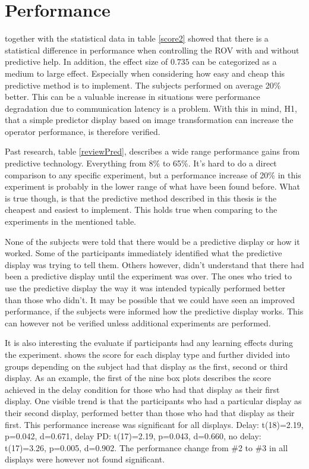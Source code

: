 \section{Performance}

 together with the statistical data in table \ref{score2} showed that there is a statistical difference in performance when controlling the ROV with and without predictive help. In addition, the effect size of $0.735$ can be categorized as a medium to large effect. Especially when considering how easy and cheap this predictive method is to implement. The subjects performed on average 20\% better. This can be a valuable increase in situations were performance degradation due to communication latency is a problem. With this in mind, H1, that a simple predictor display based on image transformation can increase the operator performance, is therefore verified.

Past research, table \ref{reviewPred}, describes a wide range performance gains from predictive technology. Everything from 8\% to 65\%. It's hard to do a direct comparison to any specific experiment, but a performance increase of 20\% in this experiment is probably in the lower range of what have been found before. What is true though, is that the predictive method described in this thesis is the cheapest and easiest to implement. This holds true when comparing to the experiments in the mentioned table.

None of the subjects were told that there would be a predictive display or how it worked. Some of the participants immediately identified what the predictive display was trying to tell them. Others however, didn't understand that there had been a predictive display until the experiment was over. The ones who tried to use the predictive display the way it was intended typically performed better than those who didn't. It may be possible that we could have seen an improved performance, if the subjects were informed how the predictive display works. This can however not be verified unless additional experiments are performed.

It is also interesting the evaluate if participants had any learning effects during the experiment.  shows the score for each display type and further divided into groups depending on the subject had that display as the first, second or third display. As an example, the first of the nine box plots describes the score achieved in the delay condition for those who had that display as their first display. One visible trend is that the participants who had a particular display as their second display, performed better than those who had that display as their first. This performance increase was significant for all displays. Delay: t(18)=2.19, p=0.042, d=0.671, delay PD: t(17)=2.19, p=0.043, d=0.660, no delay: t(17)=3.26, p=0.005, d=0.902. The performance change from \#2 to \#3 in all displays were however not found significant.

